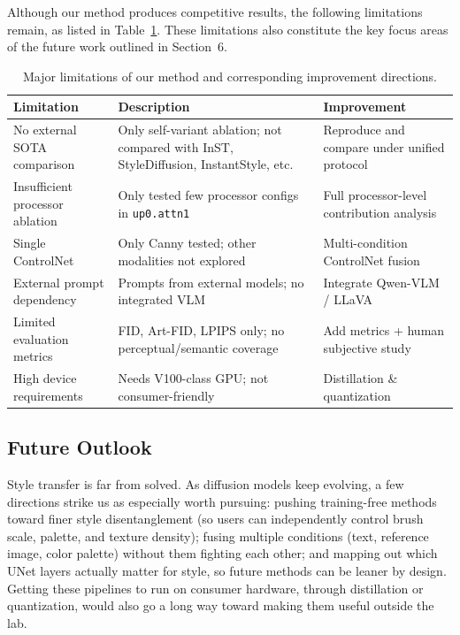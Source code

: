 \documentclass[10pt,twocolumn]{article}
\begin{document}
Although our method produces competitive results, the following limitations remain, as listed in Table~\ref{tab:limitations}. These limitations also constitute the key focus areas of the future work outlined in Section~6.

\begin{table}[htbp]
  \centering
  \caption{Major limitations of our method and corresponding improvement directions.}
  \label{tab:limitations}
  \small
  \setlength{\tabcolsep}{3pt}
  \begin{tabular}{>{\raggedright\arraybackslash}p{2.0cm}>{\raggedright\arraybackslash}p{3.0cm}>{\raggedright\arraybackslash}p{2.6cm}}
    \toprule
    Limitation & Description & Improvement \\
    \midrule
    No external SOTA comparison & Only self-variant ablation; not compared with InST, StyleDiffusion, InstantStyle, etc. & Reproduce and compare under unified protocol \\
    Insufficient processor ablation & Only tested few processor configs in \texttt{up0.attn1} & Full processor-level contribution analysis \\
    Single ControlNet & Only Canny tested; other modalities not explored & Multi-condition ControlNet fusion \\
    External prompt dependency & Prompts from external models; no integrated VLM & Integrate Qwen-VLM / LLaVA \\
    Limited evaluation metrics & FID, Art-FID, LPIPS only; no perceptual/semantic coverage & Add metrics + human subjective study \\
    High device requirements & Needs V100-class GPU; not consumer-friendly & Distillation \& quantization \\
    \bottomrule
  \end{tabular}
\end{table}

\subsection{Future Outlook}

Style transfer is far from solved. As diffusion models keep evolving, a few directions strike us as especially worth pursuing: pushing training-free methods toward finer style disentanglement (so users can independently control brush scale, palette, and texture density); fusing multiple conditions (text, reference image, color palette) without them fighting each other; and mapping out which UNet layers actually matter for style, so future methods can be leaner by design. Getting these pipelines to run on consumer hardware, through distillation or quantization, would also go a long way toward making them useful outside the lab.
\end{document}
